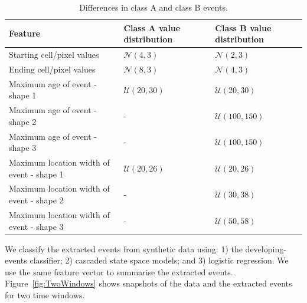 \documentclass[a4paper,11pt]{article}
\begin{document}
\begin{table}[!ht]
	\centering
	\begin{tabular}{lll}
		\toprule
    Feature                                   & Class A value distribution & Class B value distribution \\
		\midrule
    Starting cell/pixel values                & $\mathcal{N}(4,3)$         & $\mathcal{N}(2, 3)$                  \\
    Ending cell/pixel values                  & $\mathcal{N}(8,3)$         & $\mathcal{N}(4, 3)$                  \\
    Maximum age of event - shape 1            & $\mathcal{U}(20,30)$       & $\mathcal{U}(20,30)$                 \\
    Maximum age of event - shape 2            & -                          & $\mathcal{U}(100,150)$               \\
    Maximum age of event - shape 3            & -                          & $\mathcal{U}(100,150)$               \\
    Maximum location width of event - shape 1 & $\mathcal{U}(20,26)$       & $\mathcal{U}(20,26)$                 \\
    Maximum location width of event - shape 2 & -                          & $\mathcal{U}(30,38)$                 \\
    Maximum location width of event - shape 3 & -                          & $\mathcal{U}(50,58)$                 \\
		\bottomrule
	\end{tabular}
	 \caption{Differences in class A and class B events.}\label{tab:DiffClassAandB}
\end{table}

We classify the extracted events from synthetic data using: 1) the developing-events classifier; 2) cascaded state space models; and 3) logistic regression. We use the same feature vector to summarise the extracted events. Figure~\ref{fig:TwoWindows} shows snapshots of the data and the extracted events for two time windows.
\end{document}
